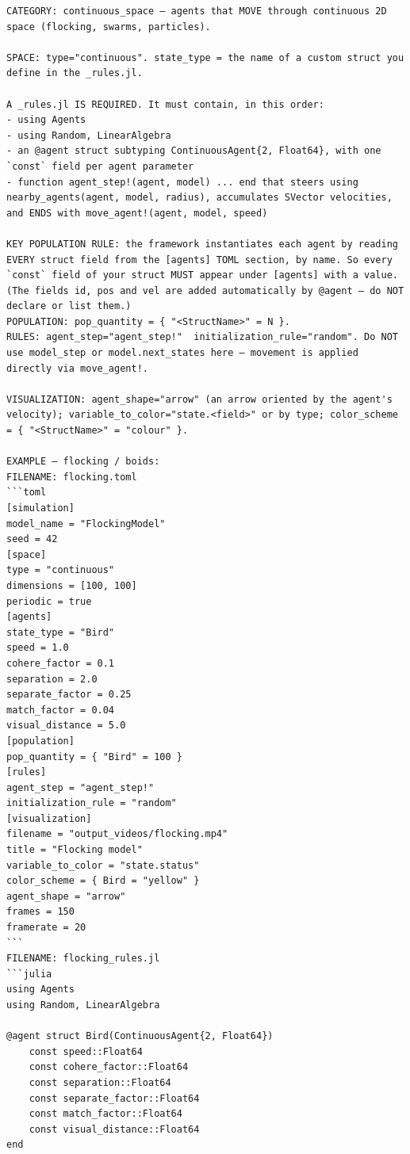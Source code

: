 \begin{lstlisting}[style=cellprompt]
CATEGORY: continuous_space — agents that MOVE through continuous 2D space (flocking, swarms, particles).

SPACE: type="continuous". state_type = the name of a custom struct you define in the _rules.jl.

A _rules.jl IS REQUIRED. It must contain, in this order:
- using Agents
- using Random, LinearAlgebra
- an @agent struct subtyping ContinuousAgent{2, Float64}, with one `const` field per agent parameter
- function agent_step!(agent, model) ... end that steers using nearby_agents(agent, model, radius), accumulates SVector velocities, and ENDS with move_agent!(agent, model, speed)

KEY POPULATION RULE: the framework instantiates each agent by reading EVERY struct field from the [agents] TOML section, by name. So every `const` field of your struct MUST appear under [agents] with a value. (The fields id, pos and vel are added automatically by @agent — do NOT declare or list them.)
POPULATION: pop_quantity = { "<StructName>" = N }.
RULES: agent_step="agent_step!"  initialization_rule="random". Do NOT use model_step or model.next_states here — movement is applied directly via move_agent!.

VISUALIZATION: agent_shape="arrow" (an arrow oriented by the agent's velocity); variable_to_color="state.<field>" or by type; color_scheme = { "<StructName>" = "colour" }.

EXAMPLE — flocking / boids:
FILENAME: flocking.toml
```toml
[simulation]
model_name = "FlockingModel"
seed = 42
[space]
type = "continuous"
dimensions = [100, 100]
periodic = true
[agents]
state_type = "Bird"
speed = 1.0
cohere_factor = 0.1
separation = 2.0
separate_factor = 0.25
match_factor = 0.04
visual_distance = 5.0
[population]
pop_quantity = { "Bird" = 100 }
[rules]
agent_step = "agent_step!"
initialization_rule = "random"
[visualization]
filename = "output_videos/flocking.mp4"
title = "Flocking model"
variable_to_color = "state.status"
color_scheme = { Bird = "yellow" }
agent_shape = "arrow"
frames = 150
framerate = 20
```
FILENAME: flocking_rules.jl
```julia
using Agents
using Random, LinearAlgebra

@agent struct Bird(ContinuousAgent{2, Float64})
    const speed::Float64
    const cohere_factor::Float64
    const separation::Float64
    const separate_factor::Float64
    const match_factor::Float64
    const visual_distance::Float64
end


\end{lstlisting}
